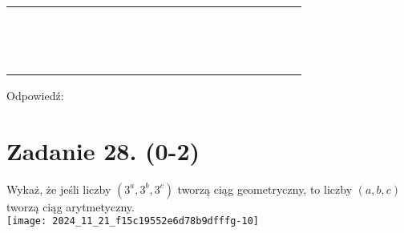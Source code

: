 \documentclass[10pt]{article}
\begin{document}
\begin{center}
\begin{tabular}{|c|c|c|c|c|c|c|c|c|c|c|c|c|c|c|c|c|c|c|c|c|c|c|}
\hline
 &  &  &  &  &  &  &  &  &  &  &  &  &  &  &  &  &  &  &  &  &  &  \\
\hline
 &  &  &  &  &  &  &  &  &  &  &  &  &  &  &  &  &  &  &  &  &  &  \\
\hline
 &  &  &  &  &  &  &  &  &  &  &  &  &  &  &  &  &  &  &  &  &  &  \\
\hline
 &  &  &  &  &  &  &  &  &  &  &  &  &  &  &  &  &  &  &  &  &  &  \\
\hline
 &  &  &  &  &  &  &  &  &  &  &  &  &  &  &  &  &  &  &  &  &  &  \\
\hline
 &  &  &  &  &  &  &  &  &  &  &  &  &  &  &  &  &  &  &  &  &  &  \\
\hline
 &  &  &  &  &  &  &  &  &  &  &  &  &  &  &  &  &  &  &  &  &  &  \\
\hline
 &  &  &  &  &  &  &  &  &  &  &  &  &  &  &  &  &  &  &  &  &  &  \\
\hline
 &  &  &  &  &  &  &  &  &  &  &  &  &  &  &  &  &  &  &  &  &  &  \\
\hline
 &  &  &  &  &  &  &  &  &  &  &  &  &  &  &  &  &  &  &  &  &  &  \\
\hline
 &  &  &  &  &  &  &  &  &  &  &  &  &  &  &  &  &  &  &  &  &  &  \\
\hline
 &  &  &  &  &  &  &  &  &  &  &  &  &  &  &  &  &  &  &  &  &  &  \\
\hline
 &  &  &  &  &  &  &  &  &  &  &  &  &  &  &  &  &  &  &  &  &  &  \\
\hline
 &  &  &  &  &  &  &  &  &  &  &  &  &  &  &  &  &  &  &  &  &  &  \\
\hline
 &  &  &  &  &  &  &  &  &  &  &  &  &  &  &  &  &  &  &  &  &  &  \\
\hline
\end{tabular}
\end{center}

Odpowiedź: \(\qquad\)

\section*{Zadanie 28. (0-2)}
Wykaż, że jeśli liczby \(\left(3^{a}, 3^{b}, 3^{c}\right)\) tworzą ciąg geometryczny, to liczby \((a, b, c)\) tworzą ciąg arytmetyczny.\\
\texttt{[image: 2024\_11\_21\_f15c19552e6d78b9dfffg-10]}
\end{document}

